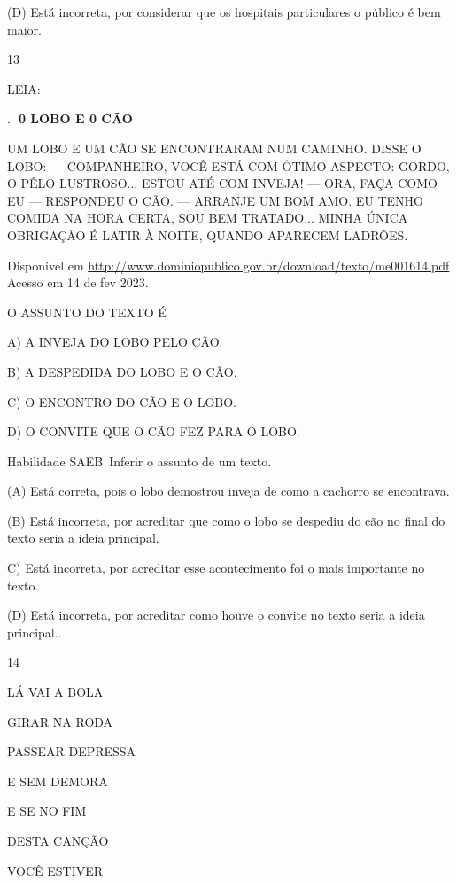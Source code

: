 {{{{{{(D) Está incorreta, por considerar que os hospitais particulares o
público é bem maior.

\num{13}

LEIA:

.~\includegraphics{media/image160.png}\includegraphics{media/image160.png}\textbf{0
LOBO E 0 CÃO}

UM LOBO E UM CÃO SE ENCONTRARAM NUM CAMINHO. DISSE O LOBO: ---
COMPANHEIRO, VOCÊ ESTÁ COM ÓTIMO ASPECTO: GORDO, O PÊLO LUSTROSO...
ESTOU ATÉ COM INVEJA! --- ORA, FAÇA COMO EU --- RESPONDEU O CÃO. ---
ARRANJE UM BOM AMO. EU TENHO COMIDA NA HORA CERTA, SOU BEM TRATADO...
MINHA ÚNICA OBRIGAÇÃO É LATIR À NOITE, QUANDO APARECEM LADRÕES.

\protect\hypertarget{_Hlk127335746}{}{}Disponível em
\url{http://www.dominiopublico.gov.br/download/texto/me001614.pdf}
Acesso em 14 de fev 2023.

O ASSUNTO DO TEXTO É

A) A INVEJA DO LOBO PELO CÃO.

B) A DESPEDIDA DO LOBO E O CÃO.

C) O ENCONTRO DO CÃO E O LOBO.

D) O CONVITE QUE O CÃO FEZ PARA O LOBO.

\protect\hypertarget{_Hlk127253071}{}{\protect\hypertarget{_Hlk127335662}{}{}}Habilidade
SAEB~Inferir o assunto de um texto.

(A) Está correta, pois o lobo demostrou inveja de como a cachorro se
encontrava.

(B) Está incorreta, por acreditar que como o lobo se despediu do cão no
final do texto seria a ideia principal.

C) Está incorreta, por acreditar esse acontecimento foi o mais
importante no texto.

(D) Está incorreta, por acreditar como houve o convite no texto seria a
ideia principal..

\num{14}

LÁ VAI A BOLA

GIRAR NA RODA

PASSEAR DEPRESSA

E SEM DEMORA

E SE NO FIM

DESTA CANÇÃO

VOCÊ ESTIVER

}}}}}}
